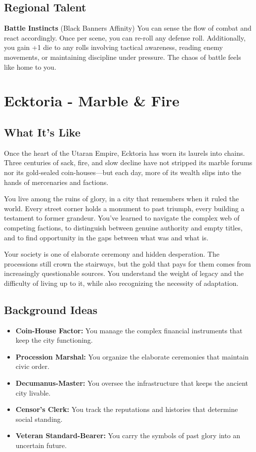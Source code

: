 \documentclass[11pt]{article}
\newcommand{\region}[1]{\section*{#1}}
\newcommand{\subregion}[1]{\subsection*{#1}}
\begin{document}
\begin{multicols}{2}
\subregion{Regional Talent}

\textbf{Battle Instincts} (Black Banners Affinity)
You can sense the flow of combat and react accordingly. Once per scene, you can re-roll any defense roll. Additionally, you gain +1 die to any rolls involving tactical awareness, reading enemy movements, or maintaining discipline under pressure. The chaos of battle feels like home to you.

\end{multicols}

\region{Ecktoria - Marble \& Fire}

\begin{multicols}{2}
\subregion{What It's Like}

Once the heart of the Utaran Empire, Ecktoria has worn its laurels into chains. Three centuries of sack, fire, and slow decline have not stripped its marble forums nor its gold-sealed coin-houses—but each day, more of its wealth slips into the hands of mercenaries and factions.

You live among the ruins of glory, in a city that remembers when it ruled the world. Every street corner holds a monument to past triumph, every building a testament to former grandeur. You've learned to navigate the complex web of competing factions, to distinguish between genuine authority and empty titles, and to find opportunity in the gaps between what was and what is.

Your society is one of elaborate ceremony and hidden desperation. The processions still crown the stairways, but the gold that pays for them comes from increasingly questionable sources. You understand the weight of legacy and the difficulty of living up to it, while also recognizing the necessity of adaptation.

\columnbreak

\subregion{Background Ideas}

\begin{itemize}[leftmargin=*]
    \item \textbf{Coin-House Factor:} You manage the complex financial instruments that keep the city functioning.
    \item \textbf{Procession Marshal:} You organize the elaborate ceremonies that maintain civic order.
    \item \textbf{Decumanus-Master:} You oversee the infrastructure that keeps the ancient city livable.
    \item \textbf{Censor's Clerk:} You track the reputations and histories that determine social standing.
    \item \textbf{Veteran Standard-Bearer:} You carry the symbols of past glory into an uncertain future.
\end{itemize}


\end{multicols}
\end{document}
